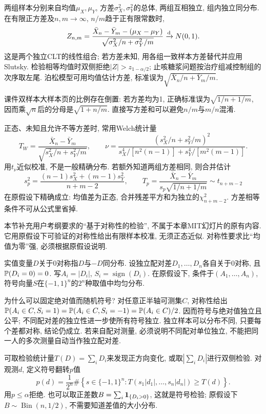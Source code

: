 两组样本分别来自均值$\mu_X,\mu_Y$, 方差$\sigma_X^2,\sigma_Y^2$的总体, 两组互相独立, 组内独立同分布. 在有限正方差及$n,m\to\infty$, $n/m$趋于正有限常数时,
\[
 Z_{n,m}=\frac{\bar X_n-\bar Y_m-(\mu_X-\mu_Y)}{\sqrt{\sigma_X^2/n+\sigma_Y^2/m}}\xrightarrow{\mathrm d} N(0,1).
\]
这是两个独立CLT的线性组合; 若方差未知, 用各组一致样本方差替代并应用Slutsky. 检验相等均值时双侧拒绝$|Z|>z_{1-\alpha/2}$; 止咳糖浆问题按治疗组减控制组的次序取左尾. 泊松模型可用均值估计方差, 标准误为$\sqrt{\bar X_n/n+\bar Y_m/m}$.

\begin{remark}
课件双样本大样本页的比例存在倒置: 若方差均为1, 正确标准误为$\sqrt{1/n+1/m}$, 因而乘$\sqrt n$后的分母是$\sqrt{1+n/m}$. 直接写方差和可以避免$n/m$与$m/n$混淆.
\end{remark}
正态、未知且允许不等方差时, 常用Welch统计量
\[
 T_W=\frac{\bar X_n-\bar Y_m}{\sqrt{s_X^2/n+s_Y^2/m}},\qquad
 \nu=\frac{(s_X^2/n+s_Y^2/m)^2}{s_X^4/[n^2(n-1)]+s_Y^4/[m^2(m-1)]}.
\]
用$t_\nu$近似校准, 不是一般精确分布. 若额外知道两组方差相同, 则合并估计
\[
 s_p^2=\frac{(n-1)s_X^2+(m-1)s_Y^2}{n+m-2},\qquad
 T_p=\frac{\bar X_n-\bar Y_m}{s_p\sqrt{1/n+1/m}}\sim t_{n+m-2}
\]
在原假设下精确成立: 均值差为正态, 合并残差平方和为独立的$\chi_{n+m-2}^2$. 方差相等条件不可从公式里省掉.

本节补充用户考纲要求的``基于对称性的检验'', 不属于本章MIT幻灯片的原有内容. 它用原假设下可验证的对称性给出有限样本校准, 无须正态近似. 对称性要求比``均值为零''强, 必须根据原假设说明.

\begin{definition}[对称分布与符号翻转]
实值变量$D$关于0对称指$D$与$-D$同分布. 设独立配对差$D_1,\ldots,D_n$各自关于0对称, 且$\mathbb P(D_i=0)=0$. 写$A_i=|D_i|$, $S_i=\operatorname{sign}(D_i)$. 在原假设下, 条件于$(A_1,\ldots,A_n)$, 符号向量$S$在$\{-1,1\}^n$的$2^n$种取值中均匀分布.
\end{definition}
为什么可以固定绝对值而随机符号? 对任意正半轴可测集$C$, 对称性给出$\mathbb P(A_i\in C,S_i=1)=\mathbb P(A_i\in C,S_i=-1)=\mathbb P(A_i\in C)/2$. 因而符号与绝对值独立且公平; 不同配对差的独立性进一步使所有符号独立. 独立样本可以分布不同, 只要每个差都对称, 结论仍成立. 若来自配对测量, 必须说明不同配对单位独立, 不能把同一人的多次测量自动当作独立配对差.

可取检验统计量$T(D)=\sum_iD_i$来发现正方向变化, 或取$|\sum_iD_i|$进行双侧检验. 对观测$d$, 定义符号翻转$p$值
\[
 p(d)=\frac1{2^n}\#\left\{s\in\{-1,1\}^n:
 T(s_1|d_1|,\ldots,s_n|d_n|)\geq T(d)\right\}.
\]
用$p\leq\alpha$拒绝. 也可以取正差数$B=\sum_i\mathbf 1_{\{D_i>0\}}$, 这就是符号检验; 原假设下$B\sim\operatorname{Bin}(n,1/2)$, 不需要知道差值的大小分布.

